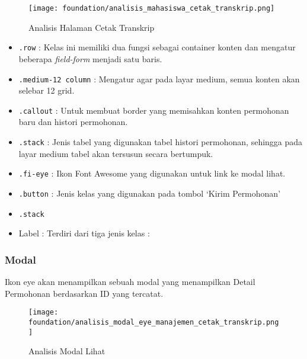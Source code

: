 \begin{figure} [H]
	\centering  
	\texttt{[image: foundation/analisis\_mahasiswa\_cetak\_transkrip.png]}
	\caption{Analisis Halaman Cetak Transkrip} 
\end{figure}
\begin{itemize}
	\item \texttt{.row} : Kelas ini memiliki dua fungsi sebagai container konten dan mengatur beberapa \textit{field-form} menjadi satu baris. 
	\item \texttt{.medium-12 column} : Mengatur agar pada layar medium, semua konten akan selebar 12 grid.
	\item \texttt{.callout} : Untuk membuat border yang memisahkan konten permohonan baru dan histori permohonan.
	\item \texttt{.stack} : Jenis tabel yang digunakan tabel histori permohonan, sehingga pada layar medium tabel akan tersusun secara bertumpuk.
	\item \texttt{.fi-eye} : Ikon Font Awesome yang digunakan untuk link ke modal lihat.
	\item \texttt{.button} : Jenis kelas yang digunakan pada tombol `Kirim Permohonan'
	\item \texttt{.stack}
	\item Label : Terdiri dari tiga jenis kelas :
	
\end{itemize}
\subsubsection{Modal}
Ikon eye akan menampilkan sebuah modal yang menampilkan Detail Permohonan berdasarkan ID yang tercatat.
\begin{figure} [H]
	\centering  
	\texttt{[image: foundation/analisis\_modal\_eye\_manajemen\_cetak\_transkrip.png]}  
	\caption{Analisis Modal Lihat} 
\end{figure}

